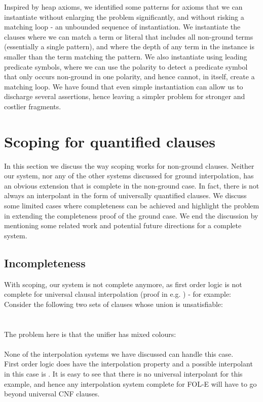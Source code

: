 Inspired by heap axioms, we identified some patterns for axioms that we can instantiate without enlarging the problem significantly, and without risking a matching loop - an unbounded sequence of instantiation. We instantiate the clauses where we can match a term or literal that includes all non-ground terms (essentially a single pattern), and where the depth of any term in the instance is smaller than the term matching the pattern. 
We also instantiate using leading predicate symbols, where we can use the polarity to detect a predicate symbol that only occurs non-ground in one polarity, and hence cannot, in itself, create a matching loop. We have found that even simple instantiation can allow us to discharge several assertions, hence leaving a simpler problem for stronger and costlier fragments.

\section{Scoping for quantified clauses}\label{section:fole:scoping}
In this section we discuss the way scoping works for non-ground clauses.
Neither our system, nor any of the other systems discussed for ground interpolation, has an obvious extension that is complete in the non-ground case. In fact, there is not always an interpolant in the form of universally quantified clauses. 
We discuss some limited cases where completeness can be achieved and highlight the problem in extending the completeness proof of the ground case.
We end the discussion by mentioning some related work and potential future directions for a complete system.

\subsection{Incompleteness}
With scoping, our system is not complete anymore, as first order logic is not complete for universal clausal interpolation (proof in e.g. \cite{KovacsVoronkov09}) - for example:\\
Consider the following two sets of clauses whose union is unsatisfiable:\\
\\
\\
The problem here is that the unifier has mixed colours:\\
\\
None of the interpolation systems we have discussed can handle this case.\\
First order logic does have the interpolation property and a possible interpolant in this case is . It is easy to see that there is no universal interpolant for this example, and hence any interpolation system complete for FOL-E will have to go beyond universal CNF clauses.

